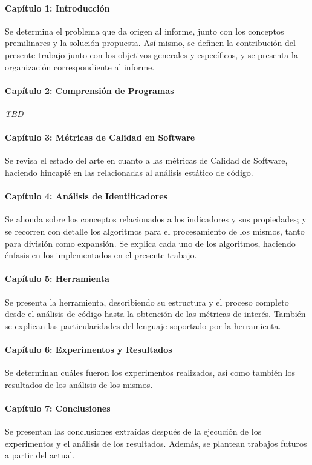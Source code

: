 \paragraph[]{Capítulo 1: Introducción} Se determina el problema que da origen al informe,
junto con los conceptos premilinares y la solución propuesta.
Así mismo, se definen la contribución del presente trabajo junto con los objetivos generales
y específicos, y se presenta la organización correspondiente al informe.

\paragraph[]{Capítulo 2: Comprensión de Programas} \textit{TBD}

\paragraph[]{Capítulo 3: Métricas de Calidad en Software} Se revisa el estado del arte
en cuanto a las métricas de Calidad de Software, haciendo hincapié en las relacionadas al análisis
estático de código.

\paragraph[]{Capítulo 4: Análisis de Identificadores} Se ahonda sobre los conceptos relacionados
a los indicadores y sus propiedades; y se recorren con detalle los algoritmos para el procesamiento
de los mismos, tanto para división como expansión.
Se explica cada uno de los algoritmos, haciendo énfasis en los implementados en el presente trabajo.

\paragraph[]{Capítulo 5: Herramienta} Se presenta la herramienta, describiendo su estructura y
el proceso completo desde el análisis de código hasta la obtención de las métricas de interés.
También se explican las particularidades del lenguaje soportado por la herramienta.

\paragraph[]{Capítulo 6: Experimentos y Resultados} Se determinan cuáles fueron los experimentos
realizados, así como también los resultados de los análisis de los mismos.

\paragraph[]{Capítulo 7: Conclusiones} Se presentan las conclusiones extraídas 
después de la ejecución de los experimentos y el análisis de los resultados.
Además, se plantean trabajos futuros a partir del actual.

